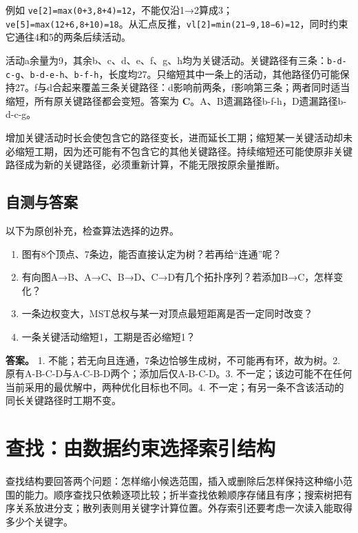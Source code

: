 例如 \allowbreak{}\texttt{ve{[}2{]}=max(0+3,}\allowbreak{}\texttt{8+4)=12}，不能仅沿1→2算成3；\allowbreak{}\texttt{ve{[}5{]}=max(12+6,}\allowbreak{}\texttt{8+10)=18}。从汇点反推，\allowbreak{}\texttt{vl{[}2{]}=min(21−9,}\allowbreak{}\texttt{18−6)=12}，同时约束它通往4和5的两条后续活动。

活动a余量为9，其余b、c、d、e、f、g、h均为关键活动。关键路径有三条：\allowbreak{}\texttt{b-d-c-g}、\allowbreak{}\texttt{b-d-e-h}、\allowbreak{}\texttt{b-f-h}，长度均27。只缩短其中一条上的活动，其他路径仍可能保持27。f与d合起来覆盖三条关键路径：d影响前两条，f影响第三条；两者同时适当缩短，所有原关键路径都会变短。答案为 \textbf{C}。A、B遗漏路径b-f-h，D遗漏路径b-d-c-g。

增加关键活动时长会使包含它的路径变长，进而延长工期；缩短某一关键活动却未必缩短工期，因为还可能有不包含它的其他关键路径。持续缩短还可能使原非关键路径成为新的关键路径，必须重新计算，不能无限按原余量推断。

\section{自测与答案}\label{ds-ch6-check}

以下为原创补充，检查算法选择的边界。

\begin{enumerate}
\def\labelenumi{\arabic{enumi}.}
\tightlist
\item
  图有8个顶点、7条边，能否直接认定为树？若再给``连通''呢？
\item
  有向图A→B、A→C、B→D、C→D有几个拓扑序列？若添加B→C，怎样变化？
\item
  一条边权变大，MST总权与某一对顶点最短距离是否一定同时改变？
\item
  一条关键活动缩短1，工期是否必缩短1？
\end{enumerate}

\textbf{答案。} 1. 不能；若无向且连通，7条边恰够生成树，不可能再有环，故为树。2. 原有A-B-C-D与A-C-B-D两个；添加后仅A-B-C-D。3. 不一定；该边可能不在任何当前采用的最优解中，两种优化目标也不同。4. 不一定；有另一条不含该活动的同长关键路径时工期不变。

\chapter{查找：由数据约束选择索引结构}\label{ds-ch7}

查找结构要回答两个问题：怎样缩小候选范围，插入或删除后怎样保持这种缩小范围的能力。顺序查找只依赖逐项比较；折半查找依赖顺序存储且有序；搜索树把有序关系放进分支；散列表则用关键字计算位置。外存索引还要考虑一次读入能取得多少个关键字。

